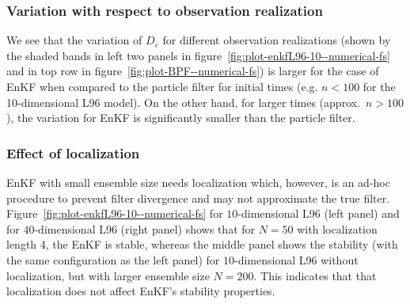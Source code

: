 \subsubsection{Variation with respect to observation realization} We see that the variation of $D_\varepsilon$ for different observation realizations (shown by the shaded bands in left two panels in figure~\ref{fig:plot-enkfL96-10--numerical-fs} and in top row in figure~\ref{fig:plot-BPF--numerical-fs}) is larger for the case of EnKF when compared to the particle filter for initial times (e.g. $n < 100$ for the 10-dimensional L96 model). On the other hand, for larger times (approx.~$n > 100$), the variation for EnKF is significantly smaller than the particle filter.
\subsubsection{Effect of localization}
EnKF with small ensemble size needs localization which, however, is an ad-hoc procedure to prevent filter divergence and may not approximate the true filter. Figure~\ref{fig:plot-enkfL96-10--numerical-fs} for $10$-dimensional L96 (left panel) and for $40$-dimensional L96 (right panel) shows that for $N=50$ with localization length 4, the EnKF is stable, whereas the middle panel shows the stability (with the same configuration as the left panel) for $10$-dimensional L96 without localization, but with larger ensemble size $N=200$. This indicates that that localization does not affect EnKF's stability properties.


